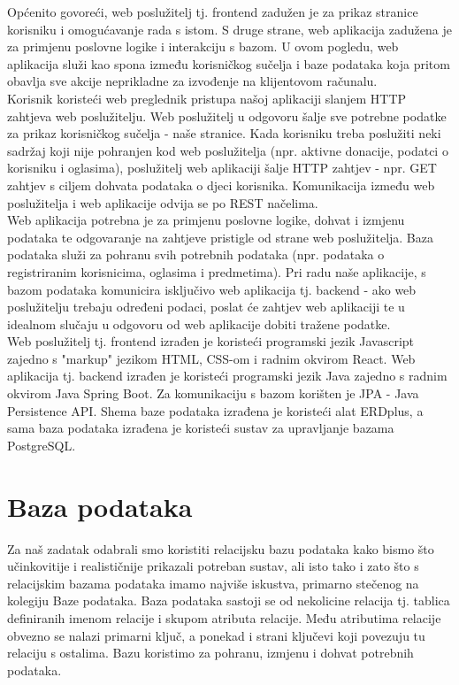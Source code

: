		Općenito govoreći, web poslužitelj tj. frontend zadužen je za prikaz stranice korisniku i omogućavanje rada s istom. S druge strane, web aplikacija zadužena je za primjenu poslovne logike i interakciju s bazom. U ovom pogledu, web aplikacija služi kao spona između korisničkog sučelja i baze podataka koja pritom obavlja sve akcije neprikladne za izvođenje na klijentovom računalu.\\[2pt]

		Korisnik koristeći web preglednik pristupa našoj aplikaciji slanjem HTTP zahtjeva web poslužitelju. Web poslužitelj u odgovoru šalje sve potrebne podatke za prikaz korisničkog sučelja - naše stranice.
		Kada korisniku treba poslužiti neki sadržaj koji nije pohranjen kod web poslužitelja (npr. aktivne donacije, podatci o korisniku i oglasima), poslužitelj web aplikaciji šalje HTTP zahtjev - npr. GET zahtjev s ciljem dohvata podataka o djeci korisnika.
		Komunikacija između web poslužitelja i web aplikacije odvija se po REST načelima.\\[2pt]

		Web aplikacija potrebna je za primjenu poslovne logike, dohvat i izmjenu podataka te odgovaranje na zahtjeve pristigle od strane web poslužitelja.
		Baza podataka služi za pohranu svih potrebnih podataka (npr. podataka o registriranim korisnicima, oglasima i predmetima). Pri radu naše aplikacije, s bazom podataka komunicira isključivo web aplikacija tj. backend - ako web poslužitelju trebaju određeni podaci, poslat će zahtjev web aplikaciji te u idealnom slučaju u odgovoru od web aplikacije dobiti tražene podatke.\\[2pt]

		Web poslužitelj tj. frontend izrađen je koristeći programski jezik Javascript zajedno s "markup" jezikom HTML, CSS-om i radnim okvirom React.
		Web aplikacija tj. backend izrađen je koristeći programski jezik Java zajedno s radnim okvirom Java Spring Boot. Za komunikaciju s bazom korišten je JPA - Java Persistence API.
		Shema baze podataka izrađena je koristeći alat ERDplus, a sama baza podataka izrađena je koristeći sustav za upravljanje bazama PostgreSQL.

		\eject
		\section{Baza podataka}
			
		Za naš zadatak odabrali smo koristiti relacijsku bazu podataka kako bismo što učinkovitije i realističnije prikazali potreban sustav, 
		ali isto tako i zato što s relacijskim bazama podataka imamo najviše iskustva, primarno stečenog na kolegiju Baze podataka.
		Baza podataka sastoji se od nekolicine relacija tj. tablica definiranih imenom relacije i skupom atributa relacije.
		Među atributima relacije obvezno se nalazi primarni ključ, a ponekad i strani ključevi koji povezuju tu relaciju s ostalima.
		Bazu koristimo za pohranu, izmjenu i dohvat potrebnih podataka.

